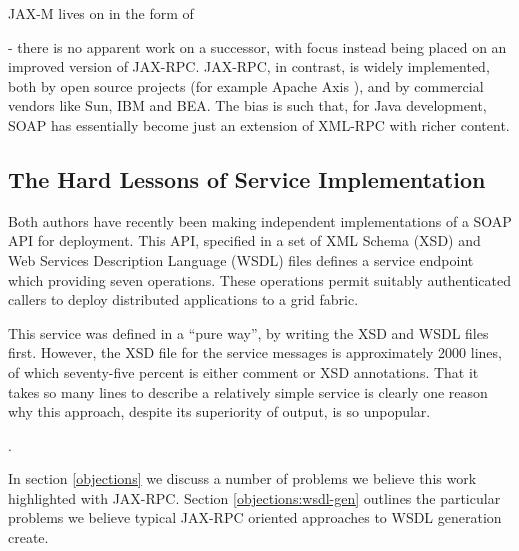 JAX-M lives on in the form of 

- there is no apparent work on a
successor, with focus instead being placed on an improved version of
JAX-RPC. JAX-RPC, in contrast, is widely implemented, both by open
source projects (for example Apache Axis \cite{axis}), and by
commercial vendors like Sun, IBM and BEA.  The bias is such that, for
Java development, SOAP has essentially become just an extension of
XML-RPC \cite{spec:XML-RPC} with richer content.

\subsection{The Hard Lessons of Service Implementation}
\label{intro:experience}

Both authors have recently been making independent implementations of
a SOAP API for deployment. This API, specified in a set of XML Schema
(XSD) \cite{spec:XSD} and Web Services Description Language (WSDL)
files \cite{spec:WSDL} defines a service endpoint which providing
seven operations. These operations permit suitably authenticated
callers to deploy distributed applications to a grid fabric.

This service was defined in a ``pure way'', by writing the XSD and
WSDL files first.  However, the XSD file for the service messages is
approximately 2000 lines, of which seventy-five percent is either
comment or XSD annotations. That it takes so many lines to describe a
relatively simple service is clearly one reason why this approach,
despite its superiority of output, is so unpopular. 

.

In section \ref{objections} we discuss a number of problems we believe
this work highlighted with JAX-RPC. Section \ref{objections:wsdl-gen}
outlines the particular problems we believe typical JAX-RPC oriented
approaches to WSDL generation create.



